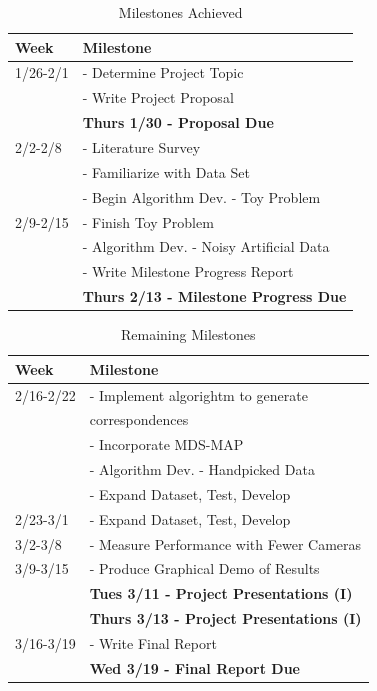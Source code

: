 \documentclass[journal]{IEEEtran}
\begin{document}
\newpage
	\begin{table}[H]
		\renewcommand{\arraystretch}{1.3}
		\caption{Milestones Achieved}
		\label{table_example}
		\centering
			\begin{tabular}{l|l}
				\hline
				\bfseries Week & \bfseries Milestone\\
				\hline
				1/26-2/1 & - Determine Project Topic\\
						 & - Write Project Proposal\\
						 & \textbf{Thurs 1/30 - Proposal Due}\\
				\hline
				2/2-2/8 & - Literature Survey\\
					       & - Familiarize with Data Set\\
					       & - Begin Algorithm Dev. - Toy Problem\\
				\hline
				2/9-2/15 & - Finish Toy Problem\\
						 & - Algorithm Dev. - Noisy Artificial Data\\
						 & - Write Milestone Progress Report\\
						 & \textbf{Thurs 2/13 - Milestone Progress Due}\\
				\hline
			\end{tabular}
	\end{table}
	\begin{table}[H]
	\renewcommand{\arraystretch}{1.3}
	\caption{Remaining Milestones}
	\label{table_example_2}
	\centering
		\begin{tabular}{l|l}
			\hline
			\bfseries Week & \bfseries Milestone\\
			\hline
			2/16-2/22 & - Implement algorightm to generate\\& \quad correspondences \\
					   & - Incorporate MDS-MAP \\
					   & - Algorithm Dev. - Handpicked Data\\
					   & - Expand Dataset, Test, Develop\\
			\hline
			2/23-3/1 & - Expand Dataset, Test, Develop\\
			\hline
			3/2-3/8 & - Measure Performance with Fewer Cameras\\
			\hline
			3/9-3/15 & - Produce Graphical Demo of Results\\
					 & \textbf{Tues 3/11 - Project Presentations (I)}\\
					 & \textbf{Thurs 3/13 - Project Presentations (I)}\\
			\hline
			3/16-3/19 & - Write Final Report\\
					   & \textbf{Wed 3/19 - Final Report Due}\\
			\hline
		\end{tabular}
	\end{table}







\end{document}
